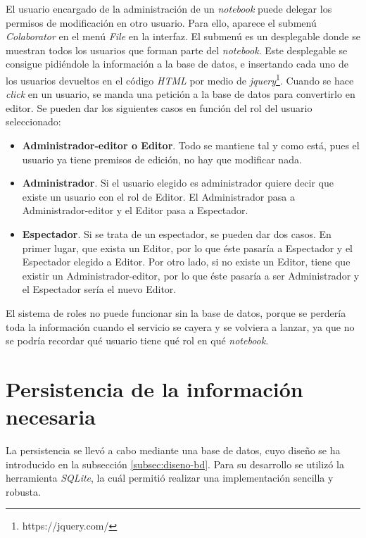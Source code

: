 \documentclass[11pt,spanish,listoffigures]{tfgetsinf}
\begin{document}
El usuario encargado de la administración de un \textit{notebook} puede delegar los permisos de modificación en otro usuario. Para ello, aparece el submenú \textit{Colaborator} en el menú \textit{File} en la interfaz. El submenú es un desplegable donde se muestran todos los usuarios que forman parte del \textit{notebook}. Este desplegable se consigue pidiéndole la información a la base de datos, e insertando cada uno de los usuarios devueltos en el código \textit{HTML} por medio de \textit{\gls{jquery}}\footnote{https://jquery.com/}. Cuando se hace \textit{click} en un usuario, se manda una petición a la base de datos para convertirlo en editor. Se pueden dar los siguientes casos en función del rol del usuario seleccionado:

\begin{itemize}

\item \textbf{Administrador-editor o Editor}. Todo se mantiene tal y como está, pues el usuario ya tiene premisos de edición, no hay que modificar nada.

\item \textbf{Administrador}. Si el usuario elegido es administrador quiere decir que existe un usuario con el rol de Editor. El Administrador pasa a Administrador-editor y el Editor pasa a Espectador.

\item \textbf{Espectador}. Si se trata de un espectador, se pueden dar dos casos. En primer lugar, que exista un Editor, por lo que éste pasaría a Espectador y el Espectador elegido a Editor. Por otro lado, si no existe un Editor, tiene que existir un Administrador-editor, por lo que éste pasaría a ser Administrador y el Espectador sería el nuevo Editor.

\end{itemize}

El sistema de roles no puede funcionar sin la base de datos, porque se perdería toda la información cuando el servicio se cayera y se volviera a lanzar, ya que no se podría recordar qué usuario tiene qué rol en qué \textit{notebook}.



\section{Persistencia de la información necesaria}
\label{sec:desarrollo-persistencia}

La persistencia se llevó a cabo mediante una base de datos, cuyo diseño se ha introducido en la subsección \ref{subsec:diseno-bd}. Para su desarrollo se utilizó la herramienta \textit{SQLite}, la cuál permitió realizar una implementación sencilla y robusta. 
\end{document}
